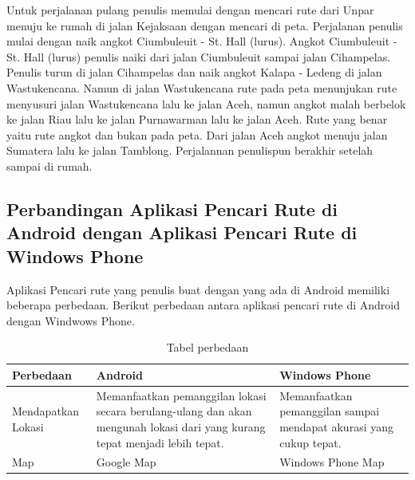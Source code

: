 \begin{itemize}
			\hspace{0.5cm}Untuk perjalanan pulang penulis memulai dengan mencari rute dari Unpar menuju ke rumah di jalan Kejaksaan dengan mencari di peta. Perjalanan penulis mulai dengan naik angkot Ciumbuleuit - St. Hall (lurus). Angkot Ciumbuleuit - St. Hall (lurus) penulis naiki dari jalan Ciumbuleuit sampai jalan Cihampelas. Penulis turun di jalan Cihampelas dan naik angkot Kalapa - Ledeng di jalan Wastukencana. Namun di jalan Wastukencana rute pada peta menunjukan rute menyusuri jalan Wastukencana lalu ke jalan Aceh, namun angkot malah berbelok ke jalan Riau lalu ke jalan Purnawarman lalu ke jalan Aceh. Rute yang benar yaitu rute angkot dan bukan pada peta. Dari jalan Aceh angkot menuju jalan Sumatera lalu ke jalan Tamblong. Perjalannan penulispun berakhir setelah sampai di rumah.
		\end{itemize}


\subsection{Perbandingan Aplikasi Pencari Rute di Android dengan Aplikasi Pencari Rute di Windows Phone}
\label{lab:Perbandingan}
\hspace{0.5cm} Aplikasi Pencari rute yang penulis buat dengan yang ada di Android memiliki beberapa perbedaan. Berikut perbedaan antara aplikasi pencari rute di Android dengan Windwows Phone.

\begin{table}[h]
	\centering
		\begin{tabular}{|p{4cm}|p{4cm}|p{4cm}|}\hline
				Perbedaan & Android & Windows Phone \\ \hline
				Mendapatkan Lokasi & Memanfaatkan pemanggilan lokasi secara berulang-ulang dan akan mengunah lokasi dari yang kurang tepat menjadi lebih tepat. & Memanfaatkan pemanggilan sampai mendapat akurasi yang cukup tepat. \\ \hline
				Map  & Google Map & Windows Phone Map \\ \hline
		\end{tabular}
	\caption{Tabel perbedaan}
	\label{tab:TabelPerbedaan}
\end{table}